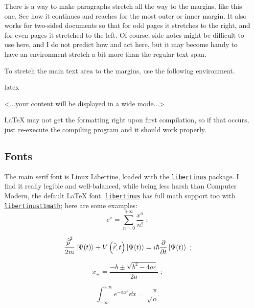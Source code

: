 \documentclass[
	a4paper,
	raggedright,
	twoside,
	12pt,
	colorful,
]{tufte-style-article}
\begin{document}
\begin{wide}
\hspace{1em}
There is a way to make paragraphs stretch all the way to the margins, like this one.	See how it continues and reaches for the most outer or inner margin. It also works for two-sided documents so that for odd pages it stretches to the right, and for even pages it stretched to the left. Of course, side notes might be difficult to use here, and I do not predict how  and   act here, but it may become handy to have an environment stretch a bit more than the regular text span.

To stretch the main text area to the margins, use the following environment.
\begin{codebox}{latex}
\begin{wide}
<...your content will be displayed in a wide mode...>
\end{wide}
\end{codebox}

\LaTeX{} may not get the formatting right upon first compilation, so if that occurs, just re-execute the compiling program and it should work properly.
\end{wide}


\subsection{Fonts}

The main serif font is Linux Libertine, loaded with the \href{www.ctan.org/pkg/libertinus}{\texttt{libertinus}} package. I find it really legible and well-balanced, while being less harsh than Computer Modern, the default \LaTeX{} font. \href{www.ctan.org/pkg/libertinus}{\texttt{libertinus}} has full math support too with \href{www.ctan.org/pkg/libertinust1math}{\texttt{libertinust1math}}; here are some examples:
$$
e^x = \sum_{n=0}^{+\infty} \frac{x^n}{n!} \;;
$$

$$
\frac{{\hat{\vec p}}^2}{2m}\ket{\Psi(t)} + V\left(\hat{\vec r},t\right)\ket{\Psi(t)} = i\hbar \pdv{}{t}\ket{\Psi(t)} \;;
$$

$$
x_\pm = \frac{-b \pm \sqrt{b^2 - 4ac}}{2a}\;;
$$

$$
\int_{-\infty}^{+\infty} e^{-\alpha x^2} \dd{x} = \sqrt\frac{\pi}{\alpha}.
$$
\end{document}
